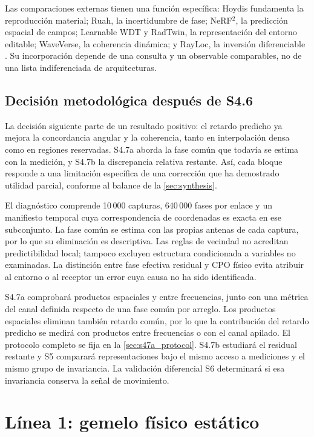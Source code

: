 Las comparaciones externas tienen una función específica: Hoydis fundamenta la reproducción
material; Ruah, la incertidumbre de fase; NeRF$^2$, la predicción espacial de campos;
Learnable WDT y RadTwin, la representación del entorno editable; WaveVerse, la coherencia
dinámica; y RayLoc, la inversión diferenciable \citep{Hoydis2024DiffRT,Ruah2024Phase,
Zhao2023NeRF2,Jiang2025LearnableWDT,Zhang2026RadTwin,Zheng2026WaveVerse,Han2026RayLoc}.
Su incorporación depende de una consulta y un observable comparables, no de una lista
indiferenciada de arquitecturas.

\subsection{Decisión metodológica después de S4.6}

La decisión siguiente parte de un resultado positivo: el retardo predicho ya
mejora la concordancia angular y la coherencia, tanto en interpolación densa
como en regiones reservadas. S4.7a aborda la fase común que todavía se estima
con la medición, y S4.7b la discrepancia relativa restante. Así, cada bloque
responde a una limitación específica de una corrección que ha demostrado
utilidad parcial, conforme al balance de la \cref{sec:synthesis}.


El diagnóstico comprende 10\,000 capturas, 640\,000 fases por enlace y un
manifiesto temporal cuya correspondencia de coordenadas es exacta en ese
subconjunto. La fase común se estima con las propias antenas de cada captura,
por lo que su eliminación es descriptiva. Las reglas de vecindad no acreditan
predictibilidad local; tampoco excluyen estructura condicionada a variables
no examinadas. La distinción entre fase efectiva residual y CPO físico evita
atribuir al entorno o al receptor un error cuya causa no ha sido identificada.

S4.7a comprobará productos espaciales y entre frecuencias, junto con una
métrica del canal definida respecto de una fase común por arreglo. Los productos
espaciales eliminan también retardo común, por lo que la contribución del
retardo predicho se medirá con productos entre frecuencias o con el canal
apilado. El protocolo completo se fija en la \cref{sec:s47a_protocol}.
S4.7b estudiará el residual restante y S5 comparará representaciones bajo el
mismo acceso a mediciones y el mismo grupo de invariancia. La validación
diferencial S6 determinará si esa invariancia conserva la señal de movimiento.

\section{Línea 1: gemelo físico estático}

